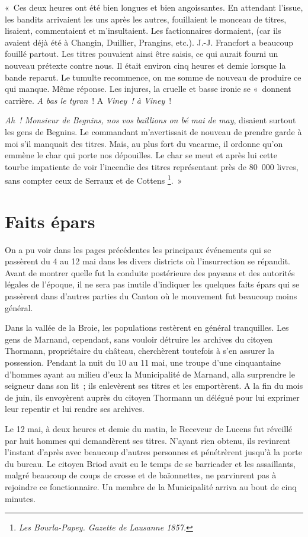 \documentclass[french,twoside]{book} %
\newenvironment{quoteblock}%
  {\begin{quoting}}
  {\end{quoting}}
\newenvironment{quotebar}{%
    \def\FrameCommand{{\color{rubric!10!}\vrule width 0.5em} \hspace{0.9em}}%
    \def\OuterFrameSep{\itemsep} %
    \MakeFramed {\advance\hsize-\width \FrameRestore}
  }%
  {%
    \endMakeFramed
  }
\renewenvironment{quoteblock}%
  {%
    \savenotes
    \setstretch{0.9}
    \normalfont
    \begin{quotebar}
  }
  {%
    \end{quotebar}
    \spewnotes
  }
\begin{document}
\begin{quoteblock}
 « Ces deux heures ont été bien longues et bien angoissantes. En attendant l’issue, les bandits arrivaient les uns après les autres, fouillaient le monceau de titres, lisaient, commentaient et m’insultaient. Les factionnaires dormaient, (car ils avaient déjà été à Changin, Duillier, Prangins, etc.). J.-J. Francfort a beaucoup fouillé partout. Les titres pouvaient ainsi être saisis, ce qui aurait fourni un nouveau prétexte contre nous. Il était environ cinq heures et demie lorsque la bande reparut. Le tumulte recommence, on me somme de nouveau de produire ce qui manque. Même réponse. Les injures, la cruelle et basse ironie se « donnent carrière. \emph{A bas le tyran} ! A \emph{Viney ! à Viney} !\par
 \emph{Ah ! Monsieur de Begnins, nos vos baillions on bé mai de may}, disaient surtout les gens de Begnins. Le commandant m’avertissait de nouveau de prendre garde à moi s’il manquait des titres. Mais, au plus fort du vacarme, il ordonne qu’on emmène le char qui porte nos dépouilles. Le char se meut et après lui cette tourbe impatiente de voir l’incendie des titres représentant près de 80 000 livres, sans compter ceux de Serraux et de Cottens \footnote{\emph{Les Bourla-Papey. Gazette de Lausanne 1857.}}. »
 \end{quoteblock}

\section[{Faits épars}]{Faits épars}
\noindent On a pu voir dans les pages précédentes les principaux événements qui se passèrent du 4 au 12 mai dans les divers districts où l’insurrection se répandit. Avant de montrer quelle fut la conduite postérieure des paysans et des autorités légales de l’époque, il ne sera pas inutile d’indiquer les quelques faits épars qui se passèrent dans d’autres parties du Canton où le mouvement fut beaucoup moins général.\par
Dans la vallée de la Broie, les populations restèrent en général tranquilles. Les gens de Marnand, cependant, sans vouloir détruire les archives du citoyen Thormann, propriétaire du château, cherchèrent toutefois à s’en assurer la possession. Pendant la nuit du 10 au 11 mai, une troupe d’une cinquantaine d’hommes ayant au milieu d’eux la Municipalité de Marnand, alla surprendre le seigneur dans son lit ; ils enlevèrent ses titres et les emportèrent. A la fin du mois de juin, ils envoyèrent auprès du citoyen Thormann un délégué pour lui exprimer leur repentir et lui rendre ses archives.\par
Le 12 mai, à deux heures et demie du matin, le Receveur de Lucens fut réveillé par huit hommes qui demandèrent ses titres. N’ayant rien obtenu, ils revinrent l’instant d’après avec beaucoup d’autres personnes et pénétrèrent jusqu’à la porte du bureau. Le citoyen Briod avait eu le temps de se barricader et les assaillants, malgré beaucoup de coups de crosse et de baïonnettes, ne parvinrent pas à rejoindre ce fonctionnaire. Un membre de la Municipalité arriva au bout de cinq minutes.\par
\end{document}
